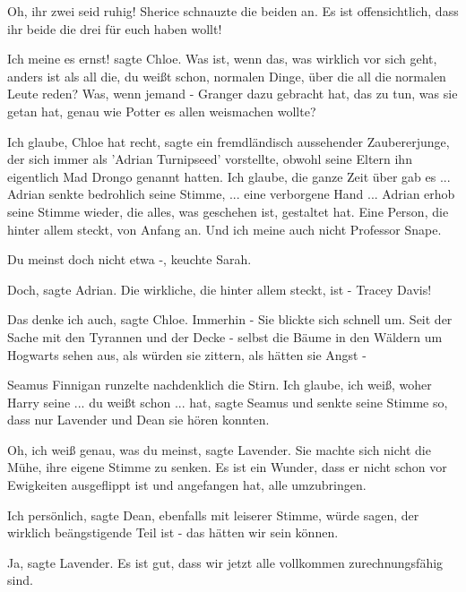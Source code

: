 \glqq{}Oh, ihr zwei seid ruhig!\grqq{} Sherice schnauzte die beiden an. \glqq{}Es
ist offensichtlich, dass ihr beide die drei für euch haben wollt!\grqq{}

\glqq{}Ich meine es ernst!\grqq{} sagte Chloe. \glqq{}Was ist, wenn das, was
wirklich vor sich geht, anders ist als all die, du weißt schon, normalen Dinge,
über die all die normalen Leute reden? Was, wenn jemand - Granger dazu gebracht
hat, das zu tun, was sie getan hat, genau wie Potter es allen weismachen
wollte?\grqq{}

\glqq{}Ich glaube, Chloe hat recht\grqq{}, sagte ein fremdländisch aussehender
Zaubererjunge, der sich immer als 'Adrian Turnipseed' vorstellte, obwohl seine
Eltern ihn eigentlich Mad Drongo genannt hatten. \glqq{}Ich glaube, die ganze
Zeit über gab es ...\grqq{} Adrian senkte bedrohlich seine Stimme, \glqq{}...
eine verborgene Hand ...\grqq{} Adrian erhob seine Stimme wieder, \glqq{}die
alles, was geschehen ist, gestaltet hat. Eine Person, die hinter allem steckt,
von Anfang an. Und ich meine auch nicht Professor Snape.\grqq{}

\glqq{}Du meinst doch nicht etwa -\grqq{}, keuchte Sarah.

\glqq{}Doch\grqq{}, sagte Adrian. \glqq{}Die wirkliche, die hinter allem steckt,
ist - Tracey Davis!\grqq{}

\glqq{}Das denke ich auch\grqq{}, sagte Chloe. \glqq{}Immerhin -\grqq{} Sie
blickte sich schnell um. \glqq{}Seit der Sache mit den Tyrannen und der Decke -
selbst die Bäume in den Wäldern um Hogwarts sehen aus, als würden sie zittern,
als hätten sie Angst -\grqq{}

Seamus Finnigan runzelte nachdenklich die Stirn. \glqq{}Ich glaube, ich weiß,
woher Harry seine ... du weißt schon ... hat\grqq{}, sagte Seamus und senkte
seine Stimme so, dass nur Lavender und Dean sie hören konnten.

\glqq{}Oh, ich weiß genau, was du meinst\grqq{}, sagte Lavender. Sie machte sich
nicht die Mühe, ihre eigene Stimme zu senken. \glqq{}Es ist ein Wunder, dass er
nicht schon vor Ewigkeiten ausgeflippt ist und angefangen hat, alle
umzubringen.\grqq{}

\glqq{}Ich persönlich\grqq{}, sagte Dean, ebenfalls mit leiserer Stimme, \glqq{}
würde sagen, der wirklich beängstigende Teil ist - das hätten wir sein
können.\grqq{}

\glqq{}Ja\grqq{}, sagte Lavender. \glqq{}Es ist gut, dass wir jetzt alle
vollkommen zurechnungsfähig sind.\grqq{}

